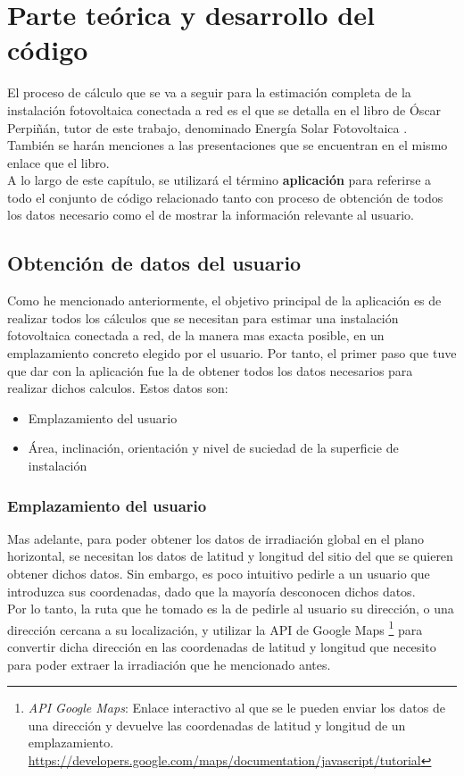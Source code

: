 \documentclass[11pt]{report}
\begin{document}
\chapter{Parte teórica y desarrollo del código}
\label{sec:theory}

El proceso de cálculo que se va a seguir para la estimación completa de la instalación fotovoltaica conectada a red es el que se detalla en el libro de Óscar Perpiñán, tutor de este trabajo, denominado Energía Solar Fotovoltaica \cite{esf_book}. También se harán menciones a las presentaciones que se encuentran en el mismo enlace que el libro.\\

A lo largo de este capítulo, se utilizará el término \textbf{aplicación} para referirse a todo el conjunto de código relacionado tanto con proceso de obtención de todos los datos necesario como el de mostrar la información relevante al usuario.

\section{Obtención de datos del usuario}
Como he mencionado anteriormente, el objetivo principal de la aplicación es de realizar todos los cálculos que se necesitan para estimar una instalación fotovoltaica conectada a red, de la manera mas exacta posible,  en un emplazamiento concreto elegido por el usuario. Por tanto, el primer paso que tuve que dar con la aplicación fue la de obtener todos los datos necesarios para realizar dichos calculos.
Estos datos son:
\begin{itemize}
\item Emplazamiento del usuario
\item Área, inclinación, orientación y nivel de suciedad de la superficie de instalación
\end{itemize}
\subsection{Emplazamiento del usuario}
Mas adelante, para poder obtener los datos de irradiación global en el plano horizontal, se necesitan los datos de latitud y longitud del sitio del que se quieren obtener dichos datos. Sin embargo, es poco intuitivo pedirle a un usuario que introduzca sus coordenadas, dado que la mayoría desconocen dichos datos.\\
Por lo tanto, la ruta que he tomado es la de pedirle al usuario su dirección, o una dirección cercana a su localización, y utilizar la API de Google Maps \footnote{\textit{API Google Maps}: Enlace interactivo al que se le pueden enviar los datos de una dirección y devuelve las coordenadas de latitud y longitud de un emplazamiento. \url{https://developers.google.com/maps/documentation/javascript/tutorial} } para convertir dicha dirección en las coordenadas de latitud y longitud que necesito para poder extraer la irradiación que he mencionado antes.\\
\end{document}
